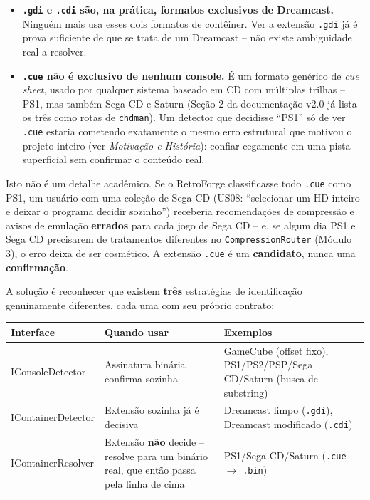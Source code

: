 \begin{itemize}
    \item \textbf{\texttt{.gdi} e \texttt{.cdi} são, na prática, formatos exclusivos de Dreamcast.} Ninguém mais usa esses dois formatos de contêiner. Ver a extensão \texttt{.gdi} já é prova suficiente de que se trata de um Dreamcast -- não existe ambiguidade real a resolver.
    \item \textbf{\texttt{.cue} \textbf{não} é exclusivo de nenhum console.} É um formato genérico de \textit{cue sheet}, usado por qualquer sistema baseado em CD com múltiplas trilhas -- PS1, mas também Sega CD e Saturn (Seção 2 da documentação v2.0 já lista os três como rotas de \texttt{chdman}). Um detector que decidisse ``PS1'' só de ver \texttt{.cue} estaria cometendo exatamente o mesmo erro estrutural que motivou o projeto inteiro (ver \textit{Motivação e História}): confiar cegamente em uma pista superficial sem confirmar o conteúdo real.
\end{itemize}

\begin{CaixaAlerta}
Isto não é um detalhe acadêmico. Se o RetroForge classificasse todo \texttt{.cue} como PS1, um usuário com uma coleção de Sega CD (US08: ``selecionar um HD inteiro e deixar o programa decidir sozinho'') receberia recomendações de compressão e avisos de emulação \textbf{errados} para cada jogo de Sega CD -- e, se algum dia PS1 e Sega CD precisarem de tratamentos diferentes no \texttt{CompressionRouter} (Módulo 3), o erro deixa de ser cosmético. A extensão \texttt{.cue} é um \textbf{candidato}, nunca uma \textbf{confirmação}.
\end{CaixaAlerta}

A solução é reconhecer que existem \textbf{três} estratégias de identificação genuinamente diferentes, cada uma com seu próprio contrato:

\begin{center}
\begin{tabular}{|>{\ttfamily}l|p{3.3cm}|p{6.8cm}|}
\hline
\textbf{Interface} & \textbf{Quando usar} & \textbf{Exemplos} \\
\hline
IConsoleDetector & Assinatura binária confirma sozinha & GameCube (offset fixo), PS1/PS2/PSP/Sega CD/Saturn (busca de substring) \\
\hline
IContainerDetector & Extensão sozinha já é decisiva & Dreamcast limpo (\texttt{.gdi}), Dreamcast modificado (\texttt{.cdi}) \\
\hline
IContainerResolver & Extensão \textbf{não} decide -- resolve para um binário real, que então passa pela linha de cima & PS1/Sega CD/Saturn (\texttt{.cue} $\rightarrow$ \texttt{.bin}) \\
\hline
\end{tabular}
\end{center}

